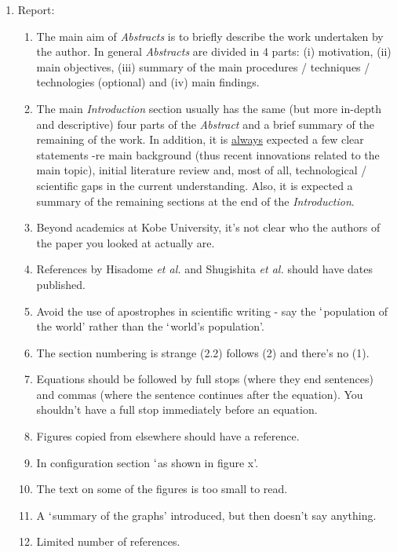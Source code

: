 \documentclass[14pt,twoside]{report}
\begin{document}
\begin{enumerate}

\item Report:
\begin{enumerate}
%
\item The main aim of {\it Abstracts} is to briefly describe the work undertaken by the author. In general {\it Abstracts} are divided in 4 parts: (i) motivation, (ii) main objectives, (iii) summary of the main procedures / techniques / technologies (optional) and (iv) main findings. 
%
\item The main {\it Introduction} section usually has the same (but more in-depth and descriptive) four parts of the {\it Abstract} and a brief summary of the remaining of the work. In addition, it is \underline{always} expected a few clear statements -re main background (thus recent innovations related to the main topic), initial literature review and, most of all, technological / scientific gaps in the current understanding. Also, it is expected a summary of the remaining sections at the end of the {\it Introduction}.
%
\item Beyond academics at Kobe University, it's not clear who the authors of the paper you looked at actually are.
%
\item References by Hisadome {\it et al.} and Shugishita {\it et al.} should have dates published.
%
\item Avoid the use of apostrophes in scientific writing - say the $\lq$population of the world' rather than the $\lq$world's population'.
%
\item The section numbering is strange (2.2) follows (2) and there's no (1).
%
\item Equations should be followed by full stops (where they end sentences) and commas (where the sentence continues after the equation). You shouldn't have a full stop immediately before an equation.
%
\item Figures copied from elsewhere should have a reference.
%
\item In configuration section $\lq$as shown in figure x'.
%
\item The text on some of the figures is too small to read.
%
\item A $\lq$summary of the graphs' introduced, but then doesn't say anything.
%
\item Limited number of references.


\end{enumerate}
\end{enumerate}
\end{document}

